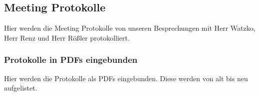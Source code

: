 \subsection{Meeting Protokolle}
Hier werden die Meeting Protokolle von unseren Besprechungen mit Herr Watzko, Herr Renz und Herr Rößler protokolliert.

\subsubsection{Protokolle in PDFs eingebunden}
Hier werden die Protokolle als PDFs eingebunden. Diese werden von alt bis neu aufgelistet.













